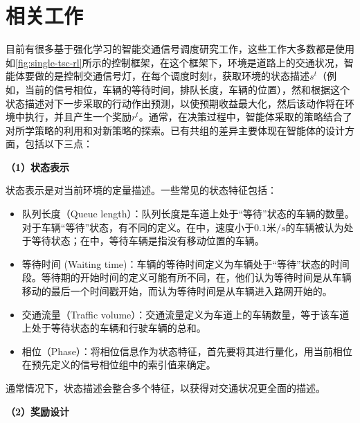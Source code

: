 \section{相关工作}
目前有很多基于强化学习的智能交通信号调度研究工作，这些工作大多数都是使用如\autoref{fig:single-tsc-rl}所示的控制框架，在这个框架下，环境是道路上的交通状况，智能体要做的是控制交通信号灯，在每个调度时刻$t$，获取环境的状态描述$s^t$（例如，当前的信号相位，车辆的等待时间，排队长度，车辆的位置），然和根据这个状态描述对下一步采取的行动作出预测，以使预期收益最大化，然后该动作将在环境中执行，并且产生一个奖励$r^t$。通常，在决策过程中，智能体采取的策略结合了对所学策略的利用和对新策略的探索。已有共组的差异主要体现在智能体的设计方面，包括以下三点：

\textbf{（1）状态表示}

状态表示是对当前环境的定量描述。一些常见的状态特征包括：
\begin{itemize}
  \item 队列长度（Queue length）：队列长度是车道上处于“等待”状态的车辆的数量。对于车辆“等待”状态，有不同的定义。在中，速度小于$0.1\text{米}/s$的车辆被认为处于等待状态；在中，等待车辆是指没有移动位置的车辆。
  \item 等待时间 (Waiting time)：车辆的等待时间定义为车辆处于“等待”状态的时间段。等待期的开始时间的定义可能有所不同，在，他们认为等待时间是从车辆移动的最后一个时间戳开始，而认为等待时间是从车辆进入路网开始的。
  \item 交通流量（Traffic volume）：交通流量定义为车道上的车辆数量，等于该车道上处于等待状态的车辆和行驶车辆的总和。
  \item 相位（Phase）：将相位信息作为状态特征，首先要将其进行量化，用当前相位在预先定义的信号相位组中的索引值来确定。
\end{itemize}
通常情况下，状态描述会整合多个特征，以获得对交通状况更全面的描述。

\textbf{（2）奖励设计}

